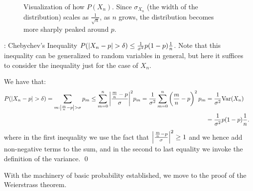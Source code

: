 \begin{figure}[htbp]
    \centering
    
    \caption{Visualization of how $P(X_n)$. Since $\sigma_{X_n}$ (the width of the distribution) scales as $\frac{1}{\sqrt{n}}$, as $n$ grows, the distribution becomes more sharply peaked around $p$.}
    \label{fig47}
\end{figure}

\begin{ntheorem}{: Chebychev's Inequality}{}
    $P(\abs{X_n - p} > \delta) \leq \frac{1}{\sigma^2}p(1-p)\frac{1}{n}$. Note that this inequality can be generalized to random variables in general, but here it suffices to consider the inequality just for the case of $X_n$.
\end{ntheorem}
\begin{nproof}
    We have that:
    \begin{align*}
        P(\abs{X_n - p} > \delta) = \sum_{m: \abs{\frac{m}{n} - p} > \sigma}p_m \leq \sum_{m=0}^n \abs{\frac{\frac{m}{n} - p}{\sigma}}^2p_m = \frac{1}{\sigma^2}\sum_{m=0}^n \left(\frac{m}{n} - p\right)^2p_m &= \frac{1}{\sigma^2}\text{Var}(X_n) 
        \\ &= \frac{1}{\sigma^2}p(1-p)\frac{1}{n}.
    \end{align*}
    where in the first inequality we use the fact that $\abs{\frac{\frac{m}{n} - p}{\sigma}}^2 \geq 1$ and we hence add non-negative terms to the sum, and in the second to last equality we invoke the definition of the variance. \qed
\end{nproof}
\noindent With the machinery of basic probability established, we move to the proof of the Weierstrass theorem.

